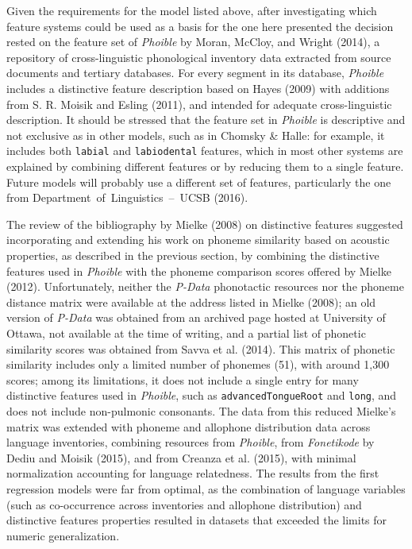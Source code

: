 \documentclass[a4paper]{article}
\begin{document}
Given the requirements for the model listed above, after investigating
which feature systems could be used as a basis for the one here
presented the decision rested on the feature set of \emph{Phoible} by
Moran, McCloy, and Wright (2014), a repository of cross-linguistic
phonological inventory data extracted from source documents and tertiary
databases. For every segment in its database, \emph{Phoible} includes a
distinctive feature description based on Hayes (2009) with additions
from S. R. Moisik and Esling (2011), and intended for adequate
cross-linguistic description. It should be stressed that the feature set
in \emph{Phoible} is descriptive and not exclusive as in other models,
such as in Chomsky \& Halle: for example, it includes both
\texttt{labial} and \texttt{labiodental} features, which in most other
systems are explained by combining different features or by reducing
them to a single feature. Future models will probably use a different
set of features, particularly the one from
Department~of~Linguistics~--~UCSB (2016).

The review of the bibliography by Mielke (2008) on distinctive features
suggested incorporating and extending his work on phoneme similarity
based on acoustic properties, as described in the previous section, by
combining the distinctive features used in \emph{Phoible} with the
phoneme comparison scores offered by Mielke (2012). Unfortunately,
neither the \emph{P-Data} phonotactic resources nor the phoneme distance
matrix were available at the address listed in Mielke (2008); an old
version of \emph{P-Data} was obtained from an archived page hosted at
University of Ottawa, not available at the time of writing, and a
partial list of phonetic similarity scores was obtained from Savva et
al. (2014). This matrix of phonetic similarity includes only a limited
number of phonemes (51), with around 1,300 scores; among its
limitations, it does not include a single entry for many distinctive
features used in \emph{Phoible}, such as \texttt{advancedTongueRoot} and
\texttt{long}, and does not include non-pulmonic consonants. The data
from this reduced Mielke's matrix was extended with phoneme and
allophone distribution data across language inventories, combining
resources from \emph{Phoible}, from \emph{Fonetikode} by Dediu and
Moisik (2015), and from Creanza et al. (2015), with minimal
normalization accounting for language relatedness. The results from the
first regression models were far from optimal, as the combination of
language variables (such as co-occurrence across inventories and
allophone distribution) and distinctive features properties resulted in
datasets that exceeded the limits for numeric generalization.
\end{document}
